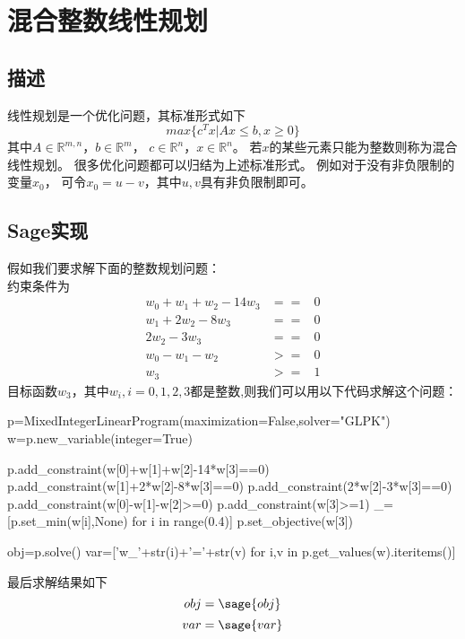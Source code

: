 \section{混合整数线性规划}
\subsection{描述}
线性规划是一个优化问题，其标准形式如下
\[max\{c^Tx|Ax\leq b,x\geq 0\}\]
其中$A\in\mathbb{R}^{m,n}$，$b\in\mathbb{R}^m$，
$c\in\mathbb{R}^n$，$x\in\mathbb{R}^n$。
若$x$的某些元素只能为整数则称为混合线性规划。
很多优化问题都可以归结为上述标准形式。
例如对于没有非负限制的变量$x_0$，
可令$x_0=u-v$，其中$u,v$具有非负限制即可。

\subsection{Sage实现}
假如我们要求解下面的整数规划问题：\\
约束条件为
\[
\begin{array}{lcr}
w_0+w_1+w_2-14w_3&==&0\\
w_1+2w_2-8w_3    &==&0\\
2w_2-3w_3         &==&0\\
w_0-w_1-w_2        &>=&0\\
w_3                  &>=&1
\end{array}
\]
目标函数$w_3$，其中$w_i,i=0,1,2,3$都是整数,则我们可以用以下代码求解这个问题：
\begin{sageblock}
p=MixedIntegerLinearProgram(maximization=False,solver="GLPK")
w=p.new_variable(integer=True)

p.add_constraint(w[0]+w[1]+w[2]-14*w[3]==0)
p.add_constraint(w[1]+2*w[2]-8*w[3]==0)
p.add_constraint(2*w[2]-3*w[3]==0)
p.add_constraint(w[0]-w[1]-w[2]>=0)
p.add_constraint(w[3]>=1)
_=[p.set_min(w[i],None) for i in range(0.4)]
p.set_objective(w[3])

obj=p.solve()
var=['w_'+str(i)+'='+str(v) for i,v in p.get_values(w).iteritems()]
\end{sageblock}

最后求解结果如下
\[obj=\sage{obj}\]
\[var=\sage{var}\]

